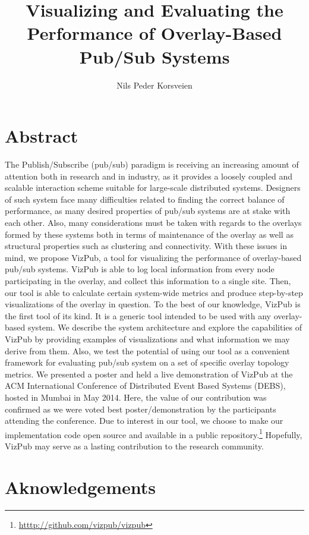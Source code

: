 \documentclass[UKenglish, a4paper]{ifimaster}
\title{Visualizing and Evaluating the Performance of Overlay-Based Pub/Sub Systems}
\subtitle{}
\author{Nils Peder Korsveien}
\newcommand{\demo}{{\sc VizPub}\xspace}
\begin{document}
\ififorside{}
\frontmatter{}
\maketitle{}

\chapter*{Abstract}

The Publish/Subscribe (pub/sub) paradigm is receiving an increasing
amount of attention both in research and in industry, as it provides a
loosely coupled and scalable interaction scheme suitable for large-scale
distributed systems. Designers of such system face many difficulties
related to finding the correct balance of performance, as many desired
properties of pub/sub systems are at stake with each other. Also, many
considerations must be taken with regards to the overlays formed by
these systems both in terms of maintenance of the overlay as well as
structural properties such as clustering and connectivity. With these
issues in mind, we propose \demo{}, a tool for visualizing the
performance of overlay-based pub/sub systems. \demo{} is able to log
local information from every node participating in the overlay, and
collect this information to a single site. Then, our tool is able to
calculate certain system-wide metrics and produce step-by-step
visualizations of the overlay in question. To the best of our knowledge,
\demo{} is the first tool of its kind. It is a generic tool intended to
be used with any overlay-based system. We describe the system
architecture and explore the capabilities of \demo{} by providing
examples of visualizations and what information we may derive from them.
Also, we test the potential of using our tool as a convenient framework
for evaluating pub/sub system on a set of specific overlay topology
metrics. We presented a poster and held a live demonstration of \demo{} at the
ACM International Conference of Distributed Event Based Systems (DEBS),
hosted in Mumbai in May 2014. Here, the value of our contribution was
confirmed as we were voted best poster/demonstration by the participants
attending the conference. Due to interest in our tool, we choose to make
our implementation code open source and available in a public
repository.\footnote{\url{htttp://github.com/vizpub/vizpub}} Hopefully,
\demo{} may serve as a lasting contribution to the research community.

\tableofcontents{}
\listoffigures{}
\listoftables{}
\chapter*{Aknowledgements}
\end{document}
